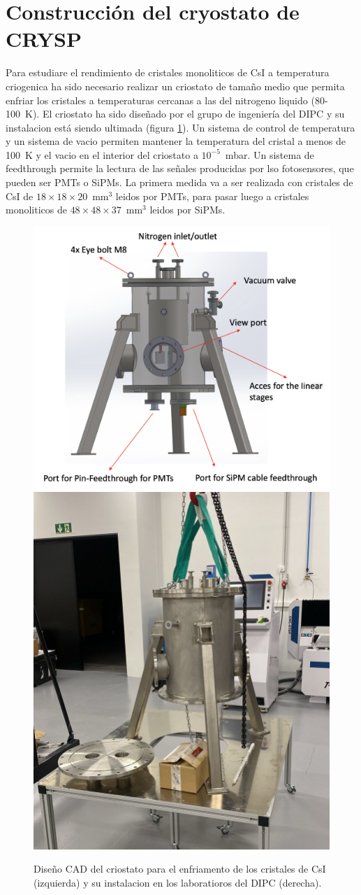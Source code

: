 \documentclass[12pt,a4paper,article]{report} %
\begin{document}
\section*{Construcción del cryostato de CRYSP}

Para estudiare el rendimiento de cristales monoliticos de CsI a temperatura criogenica ha sido necesario realizar un criostato de tamaño medio que permita enfriar los cristales a temperaturas cercanas a las del nitrogeno liquido (80-100~K). El criostato ha sido diseñado por el grupo de ingeniería del DIPC y su instalacion está siendo ultimada (figura \ref{fig:criostato}). Un sistema de control de temperatura y un sistema de vacio permiten mantener la temperatura del cristal a menos de 100~K y el vacio en el interior del criostato a $10^{-5}$~mbar. Un sistema de feedthrough permite la lectura de las señales producidas por lso fotosensores, que pueden ser PMTs o SiPMs. La primera medida va a ser realizada con cristales de CsI de $18\times18\times20$~mm$^3$ leidos por PMTs, para pasar luego a cristales monoliticos de $48\times48\times37$~mm$^3$ leidos por SiPMs.

\begin{figure}[ht!]
  \begin{center}
  \includegraphics[width=0.49\linewidth]{img/criostato_cad.png}
  \includegraphics[width=0.35\linewidth]{img/criostato_instalacion.jpg}
  \qquad
  \caption{Diseño CAD del criostato para el enfriamento de los cristales de CsI (izquierda) y su instalacion en los laboratioros del DIPC (derecha).}\label{fig:criostato}
  \end{center}
  \end{figure}
\end{document}
